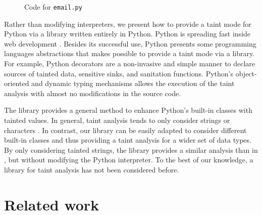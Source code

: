 \begin{wrapfigure}{r}{6.5cm}
\vspace{-25pt}
{\small{

\caption{\label{fig:example}Code for \texttt{email.py}}
}}
\vspace{-15pt}
\end{wrapfigure}
Rather than modifying interpreters, we present how to provide
a taint mode for Python via a library written entirely in Python. 
Python is spreading fast inside
web development \cite{WikiPython}. 
Besides its successful use, Python presents 
some programming languages abstractions that makes possible 
to provide a taint mode via a library. For example, 
Python decorators \cite{Lutz:1999:LP} are a non-invasive and simple 
manner to declare sources of tainted data, sensitive sinks, and 
sanitation functions. Python's 
object-oriented and dynamic typing mechanisms allows the 
execution of the taint analysis with almost no modifications in the
source code. 


The library provides a general method to enhance Python's built-in
classes with tainted values. 
In general, taint
analysis tends to only consider strings or characters 
\cite{Perl,Nguyen05,Haldar05dynamictaint,KozlovPetukhov07,Futo07,SeoLam2010}.
In contrast, our library 
can be easily adapted to consider different built-in
classes
and thus providing a taint
analysis for a wider set of data types. 
By only considering tainted strings, the library provides 
a similar analysis than in \cite{KozlovPetukhov07},
but without modifying the Python interpreter.
To the best of our knowledge, a
library for taint analysis has not been considered before. 

\section{Related work}
